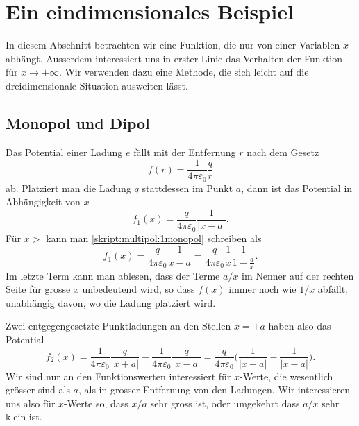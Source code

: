 %
%
%
\section{Ein eindimensionales Beispiel%
\label{skript:multipol:1dimbeispiel}}
In diesem Abschnitt betrachten wir eine Funktion, die nur von einer
Variablen $x$ abhängt.
Ausserdem interessiert uns in erster Linie das Verhalten der Funktion
für $x\to\pm\infty$.
Wir verwenden dazu eine Methode, die sich leicht auf die dreidimensionale
Situation ausweiten lässt.

\subsection{Monopol und Dipol}
Das Potential einer Ladung $e$ fällt mit der Entfernung $r$ nach dem
Gesetz
\[
f(r)=\frac1{4\pi\varepsilon_0}\frac{q}r
\]
ab.
Platziert man die Ladung $q$ stattdessen im Punkt $a$, dann ist das
Potential in Abhängigkeit von $x$
\begin{equation}
f_1(x) = \frac{q}{4\pi\varepsilon_0} \frac1{|x-a|}.
\label{skript:multipol:1monopol}
\end{equation}
Für $x>$ kann man \eqref{skript:multipol:1monopol} schreiben als
\begin{equation}
f_1(x)
=
\frac{q}{4\pi\varepsilon_0} \frac1{x-a}
=
\frac{q}{4\pi\varepsilon_0} \frac1x\frac1{1-\displaystyle\frac{a}{x}}.
\label{skript:multipol:1abfall}
\end{equation}
Im letzte Term kann man ablesen, dass der Terme $a/x$ im Nenner
auf der rechten Seite für grosse $x$ unbedeutend wird, so dass $f(x)$
immer noch wie $1/x$ abfällt, unabhängig davon, wo die Ladung platziert
wird.

Zwei entgegengesetzte Punktladungen an den Stellen $x=\pm a$ haben also
das Potential
\begin{equation}
f_2(x)
=
\frac1{4\pi\varepsilon_0}\frac{q}{|x+a|}
-
\frac1{4\pi\varepsilon_0}\frac{q}{|x-a|}
=
\frac{q}{4\pi\varepsilon_0}\biggl( \frac1{|x+a|} - \frac1{|x-a|} \biggr).
\label{skript:multipol:1dipol}
\end{equation}
Wir sind nur an den Funktionswerten interessiert für $x$-Werte, die
wesentlich grösser sind als $a$, als in grosser Entfernung von
den Ladungen.
Wir interessieren uns also für $x$-Werte so, dass $x/a$ sehr gross ist,
oder umgekehrt dass $a/x$ sehr klein ist.

